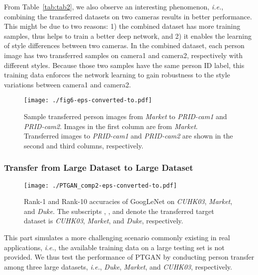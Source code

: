 \documentclass[10pt,twocolumn,letterpaper]{article}
\begin{document}
From Table~\ref{tab:tab2}, we also observe an interesting phenomenon,\emph{ i.e.}, combining the transferred datasets on two cameras results in better performance. This might be due to two reasons: 1) the combined dataset has more training samples, thus helps to train a better deep network, and 2) it enables the learning of style differences between two cameras. In the combined dataset, each person image has two transferred samples on camera1 and camera2, respectively with different styles. Because those two samples have the same person ID label, this training data enforces the network learning to gain robustness to the style variations between camera1 and camera2.

\begin{figure}
\begin{center}
\texttt{[image: ./fig6-eps-converted-to.pdf]}
\end{center}
\caption{Sample transferred person images from \emph{Market} to \emph{PRID-cam1} and \emph{PRID-cam2}. Images in the first column are from \emph{Market}. Transferred images to \emph{PRID-cam1} and \emph{PRID-cam2} are shown in the second and third columns, respectively.}
\label{fig:fig6}
\end{figure}


\subsubsection{Transfer from Large Dataset to Large Dataset}
\label{sec:BigToBig}


\begin{figure*}[ht!]
    \begin{center}
    \texttt{[image: ./PTGAN\_comp2-eps-converted-to.pdf]}
    \end{center}
    \caption{Rank-1 and Rank-10 accuracies of GoogLeNet on \emph{CUHK03}, \emph{Market}, and \emph{Duke}. The subscripts , , and  denote the transferred target dataset is \emph{CUHK03}, \emph{Market}, and \emph{Duke}, respectively. }
    \label{fig:PTGAN_comp}
\end{figure*}



This part simulates a more challenging scenario commonly existing in real applications, \emph{i.e.}, the available training data on a large testing set is not provided. We thus test the performance of PTGAN by conducting person transfer among three large datasets, \emph{i.e.}, \emph{Duke}, \emph{Market}, and \emph{CUHK03}, respectively.
\end{document}

